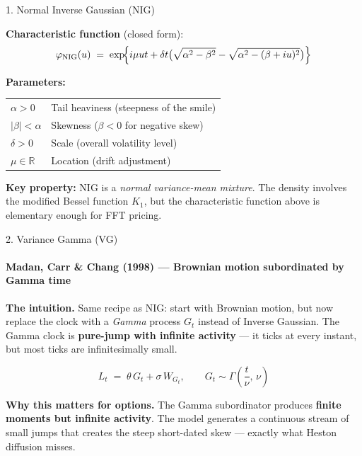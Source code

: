 \documentclass[aspectratio=169]{beamer}
\begin{document}
\begin{frame}{1. Normal Inverse Gaussian (NIG)}

\textbf{Characteristic function} (closed form):
\[
\varphi_{\text{NIG}}(u) \;=\;
\exp\!\Bigl\{
i\mu u t + \delta t\bigl(
\sqrt{\alpha^2 - \beta^2} - \sqrt{\alpha^2 - (\beta+iu)^2}
\bigr)
\Bigr\}
\]

\textbf{Parameters:} 
\quad
\begin{tabular}{@{}ll@{}}\toprule
$\alpha > 0$ & Tail heaviness (steepness of the smile)\\
$|\beta| < \alpha$ & Skewness ($\beta<0$ for negative skew)\\
$\delta > 0$ & Scale (overall volatility level)\\
$\mu \in \mathbb{R}$ & Location (drift adjustment)\\\bottomrule
\end{tabular}

\vspace{0.2cm}
\textbf{Key property:} NIG is a \emph{normal variance-mean mixture}. The density involves the modified Bessel function $K_1$, but the characteristic function above is elementary enough for FFT pricing.

\end{frame}

\begin{frame}{2. Variance Gamma (VG)}
\framesubtitle{Madan, Carr \& Chang (1998) --- Brownian motion subordinated by Gamma time}

\textbf{The intuition.} Same recipe as NIG: start with Brownian motion, but now replace the clock with a \emph{Gamma} process $G_t$ instead of Inverse Gaussian. The Gamma clock is \textbf{pure-jump with infinite activity} --- it ticks at every instant, but most ticks are infinitesimally small.

\[
L_t \;=\; \theta\, G_t + \sigma\, W_{G_t}, \qquad G_t \sim \Gamma\!\left(\frac{t}{\nu},\,\nu\right)
\]

\vspace{0.2cm}
\textbf{Why this matters for options.} The Gamma subordinator produces \textbf{finite moments but infinite activity}. The model generates a continuous stream of small jumps that creates the steep short-dated skew --- exactly what Heston diffusion misses.

\end{frame}
\end{document}
